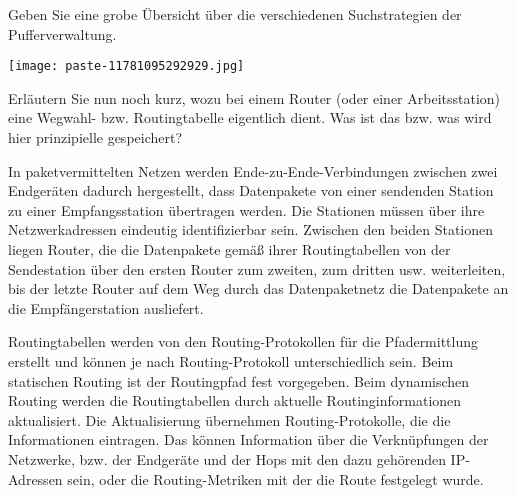 \documentclass{article}
\begin{document}
\begin{tcolorbox}[colback=white!10!white,colframe=lightgray!75!black,
  savelowerto=\jobname_ex.tex]

\begin{center}
 Geben Sie eine grobe Übersicht über die verschiedenen Suchstrategien der Pufferverwaltung. 

\end{center}

\tcblower

\justifying
\texttt{[image: paste-11781095292929.jpg]}

\end{tcolorbox}
\begin{tcolorbox}[colback=white!10!white,colframe=lightgray!75!black,
  savelowerto=\jobname_ex.tex]

\begin{center}
 Erläutern Sie nun noch kurz, wozu bei einem Router (oder einer Arbeitsstation) eine Wegwahl- bzw. Routingtabelle eigentlich dient. Was ist das bzw. was wird hier prinzipielle gespeichert? 

\end{center}

\tcblower

\justifying
In paketvermittelten Netzen werden Ende-zu-Ende-Verbindungen zwischen zwei Endgeräten dadurch hergestellt, dass Datenpakete von einer sendenden Station zu einer Empfangsstation übertragen werden. Die Stationen müssen über ihre Netzwerkadressen eindeutig identifizierbar sein. Zwischen den beiden Stationen liegen Router, die die Datenpakete gemäß ihrer Routingtabellen von der Sendestation über den ersten Router zum zweiten, zum dritten usw. weiterleiten, bis der letzte Router auf dem Weg durch das Datenpaketnetz die Datenpakete an die Empfängerstation ausliefert.

\end{tcolorbox}
\begin{tcolorbox}[colback=white!10!white,colframe=lightgray!75!black,
  savelowerto=\jobname_ex.tex]

\begin{center}
Routingtabellen werden von den Routing-Protokollen für die Pfadermittlung erstellt und können je nach Routing-Protokoll unterschiedlich sein. Beim statischen Routing ist der Routingpfad fest vorgegeben. Beim dynamischen Routing werden die Routingtabellen durch aktuelle Routinginformationen aktualisiert. Die Aktualisierung übernehmen Routing-Protokolle, die die Informationen eintragen. Das können Information über die Verknüpfungen der Netzwerke, bzw. der Endgeräte und der Hops mit den dazu gehörenden IP-Adressen sein, oder die Routing-Metriken mit der die Route festgelegt wurde.

\end{center}

\tcblower

\justifying

\end{tcolorbox}
\end{document}
